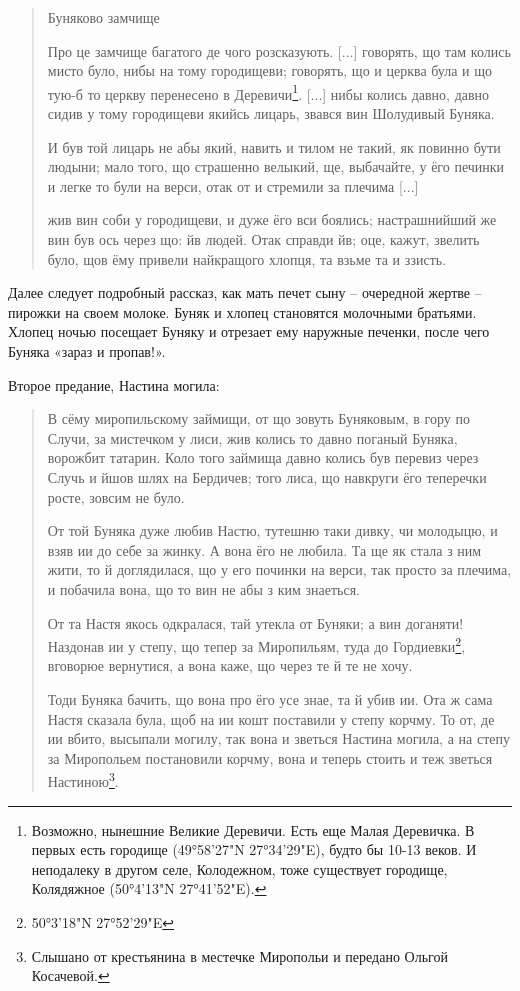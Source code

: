 \begin{quotation}
Буняково замчище

Про це замчище багатого де чого розсказують. [...] говорять, що там колись мисто було, нибы на тому городищеви; говорять, що и церква була и що тую-б то церкву перенесено в Деревичи\footnote{Возможно, нынешние Великие Деревичи. Есть еще Малая Деревичка. В первых есть городище (49°58'27"N 27°34'29"E), будто бы 10-13 веков. И неподалеку в другом селе, Колодежном, тоже существует городище, Колядяжное (50°4'13"N 27°41'52"E).}. [...] нибы колись давно, давно сидив у тому городищеви якийсь лицарь, звався вин Шолудивый Буняка.

И був той лицарь не абы який, навить и тилом не такий, як повинно бути людыни; мало того, що страшенно велыкий, ще, выбачайте, у ёго печинки и легке то були на верси, отак от и стремили за плечима [...]

жив вин соби у городищеви, и дуже ёго вси боялись; настрашнийший же вин був ось через що: йв людей. Отак справди йв; оце, кажут, звелить було, щов ёму привели найкращого хлопця, та взьме та и ззисть.
\end{quotation}

Далее следует подробный рассказ, как мать печет сыну – очередной жертве – пирожки на своем молоке. Буняк и хлопец становятся молочными братьями. Хлопец ночью посещает Буняку и отрезает ему наружные печенки, после чего Буняка «зараз и пропав!».

Второе предание, Настина могила:

\begin{quotation}
В сёму миропильскому займищи, от що зовуть Буняковым, в гору по Случи, за мистечком у лиси, жив колись то давно поганый Буняка, ворожбит татарин. Коло того займища давно колись був перевиз через Случь и йшов шлях на Бердичев; того лиса, що навкруги ёго теперечки росте, зовсим не було.

От той Буняка дуже любив Настю, тутешню таки дивку, чи молодыцю, и взяв ии до себе за жинку. А вона ёго не любила. Та ще як стала з ним жити, то й доглядилася, що у его починки на верси, так просто за плечима, и побачила вона, що то вин не абы з ким знаеться.

От та Настя якось одкралася, тай утекла от Буняки; а вин доганяти! Наздонав ии у степу, що тепер за Миропильям, туда до Гордиевки\footnote{50°3'18"N 27°52'29"E}, вговорюе вернутися, а вона каже, що через те й те не хочу.

Тоди Буняка бачить, що вона про ёго усе знае, та й убив ии. Ота ж сама Настя сказала була, щоб на ии кошт поставили у степу корчму. То от, де ии вбито, высыпали могилу, так вона и зветься Настина могила, а на степу за Миропольем постановили корчму, вона и теперь стоить и теж зветься Настиною\footnote{Слышано от крестьянина в местечке Миропольи и передано Ольгой Косачевой.}.
\end{quotation}

